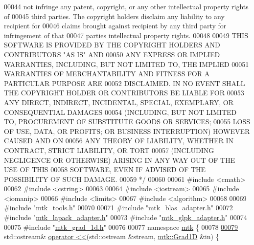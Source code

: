 \begin{DoxyCode}
00044 \textcolor{comment}{not infringe any patent, copyright, or any other intellectual property rights of}
00045 \textcolor{comment}{third parties. The copyright holders disclaim any liability to any recipient for}
00046 \textcolor{comment}{claims brought against recipient by any third party for infringement of that}
00047 \textcolor{comment}{parties intellectual property rights.}
00048 \textcolor{comment}{}
00049 \textcolor{comment}{THIS SOFTWARE IS PROVIDED BY THE COPYRIGHT HOLDERS AND CONTRIBUTORS "AS IS" AND}
00050 \textcolor{comment}{ANY EXPRESS OR IMPLIED WARRANTIES, INCLUDING, BUT NOT LIMITED TO, THE IMPLIED}
00051 \textcolor{comment}{WARRANTIES OF MERCHANTABILITY AND FITNESS FOR A PARTICULAR PURPOSE ARE}
00052 \textcolor{comment}{DISCLAIMED. IN NO EVENT SHALL THE COPYRIGHT HOLDER OR CONTRIBUTORS BE LIABLE FOR}
00053 \textcolor{comment}{ANY DIRECT, INDIRECT, INCIDENTAL, SPECIAL, EXEMPLARY, OR CONSEQUENTIAL DAMAGES}
00054 \textcolor{comment}{(INCLUDING, BUT NOT LIMITED TO, PROCUREMENT OF SUBSTITUTE GOODS OR SERVICES;}
00055 \textcolor{comment}{LOSS OF USE, DATA, OR PROFITS; OR BUSINESS INTERRUPTION) HOWEVER CAUSED AND ON}
00056 \textcolor{comment}{ANY THEORY OF LIABILITY, WHETHER IN CONTRACT, STRICT LIABILITY, OR TORT}
00057 \textcolor{comment}{(INCLUDING NEGLIGENCE OR OTHERWISE) ARISING IN ANY WAY OUT OF THE USE OF THIS}
00058 \textcolor{comment}{SOFTWARE, EVEN IF ADVISED OF THE POSSIBILITY OF SUCH DAMAGE.}
00059 \textcolor{comment}{*/}
00060 
00061 \textcolor{preprocessor}{#include <cmath>}
00062 \textcolor{preprocessor}{#include <cstring>}
00063 
00064 \textcolor{preprocessor}{#include <iostream>}
00065 \textcolor{preprocessor}{#include <iomanip>}
00066 \textcolor{preprocessor}{#include <limits>}
00067 \textcolor{preprocessor}{#include <algorithm>}
00068 
00069 \textcolor{preprocessor}{#include "\hyperlink{mtk__tools_8h}{mtk\_tools.h}"}
00070 
00071 \textcolor{preprocessor}{#include "\hyperlink{mtk__blas__adapter_8h}{mtk\_blas\_adapter.h}"}
00072 \textcolor{preprocessor}{#include "\hyperlink{mtk__lapack__adapter_8h}{mtk\_lapack\_adapter.h}"}
00073 \textcolor{preprocessor}{#include "\hyperlink{mtk__glpk__adapter_8h}{mtk\_glpk\_adapter.h}"}
00074 
00075 \textcolor{preprocessor}{#include "\hyperlink{mtk__grad__1d_8h}{mtk\_grad\_1d.h}"}
00076 
00077 \textcolor{keyword}{namespace }\hyperlink{namespacemtk}{mtk} \{
00078 
\hypertarget{mtk__grad__1d_8cc_source_l00079}{}\hyperlink{namespacemtk_a3f546b8a3743b8719db17e33f2d7ef7f}{00079} std::ostream& \hyperlink{namespacemtk_ad3bcf52cda59ddb5fc7b4bdce76c46dc}{operator <<}(std::ostream &stream, \hyperlink{classmtk_1_1Grad1D}{mtk::Grad1D} &in) \{

\end{DoxyCode}
